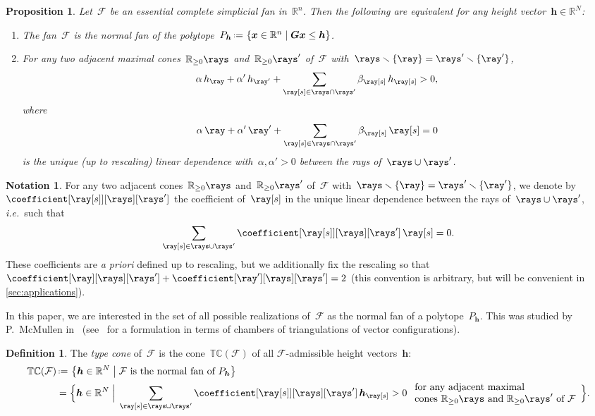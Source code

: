 \documentclass{amsart}
\newtheorem{proposition}[theorem]{Proposition}
\theoremstyle{definition}
\newtheorem{definition}[theorem]{Definition}
\newtheorem{notation}[theorem]{Notation}
\newcommand{\R}{\mathbb{R}} %
\renewcommand{\b}[1]{{\boldsymbol{#1}}} %
\newcommand{\set}[2]{\left\{ #1 \;\middle|\; #2 \right\}} %
\newcommand{\Bigset}[2]{\Big\{ #1 \;\Big|\; #2 \Big\}} %
\newcommand{\ssm}{\smallsetminus} %
\newcommand{\eqdef}{\mbox{\,\raisebox{0.2ex}{\scriptsize\ensuremath{\mathrm:}}\ensuremath{=}\,}} %
\newcommand{\ie}{\textit{i.e.}~} %
\newcommand{\apriori}{\textit{a priori}} %
\newcommand{\darkblue}{\color{darkblue}} %
\newcommand{\defn}[1]{\textsl{\darkblue #1}} %
\newcommand{\Fan}{\mathcal{F}} %
\newcommand{\typeCone}{\mathbb{TC}} %
\begin{document}
\begin{proposition}
\label{prop:characterizationPolytopalFan}
Let~$\Fan$ be an essential complete simplicial fan in~$\R^n$. Then the following are equivalent for any height vector~$\b{h} \in \R^N$:
\begin{enumerate}
\item The fan~$\Fan$ is the normal fan of the polytope~$P_\b{h} \eqdef \set{\b{x} \in \R^n}{\b{G}\b{x} \le \b{h}}$.
\item For any two adjacent maximal cones~$\R_{\ge0}\rays$ and~$\R_{\ge0}\rays'$ of~$\Fan$ with~$\rays \ssm \{\ray\} = \rays' \ssm \{\ray'\}$,
\[
\alpha \, h_{\ray} + \alpha' \, h_{\ray'} + \sum_{\ray[s] \in \rays \cap \rays'} \beta_{\ray[s]} \, h_{\ray[s]} > 0,
\]
where
\[
\alpha \, \ray + \alpha' \, \ray' + \sum_{\ray[s] \in \rays \cap \rays'} \beta_{\ray[s]} \, \ray[s] = 0
\]
is the unique (up to rescaling) linear dependence with~$\alpha, \alpha' > 0$ between the rays of~$\rays \cup \rays'$.
\end{enumerate}
\end{proposition}

\begin{notation}
For any two adjacent cones~$\R_{\ge0}\rays$ and~$\R_{\ge0}\rays'$ of~$\Fan$ with~$\rays \ssm \{\ray\} = \rays' \ssm \{\ray'\}$, we denote by~$\coefficient[{\ray[s]}][\rays][\rays']$ the coefficient of~$\ray[s]$ in the unique linear dependence between the rays of~$\rays \cup \rays'$, \ie such that
\[
\sum_{\ray[s] \in \rays \cup \rays'} \coefficient[{\ray[s]}][\rays][\rays'] \, \ray[s] = 0.
\]
These coefficients are \apriori{} defined up to rescaling, but we additionally fix the rescaling so that~${\coefficient[\ray][\rays][\rays'] + \coefficient[\ray'][\rays][\rays'] = 2}$ (this convention is arbitrary, but will be convenient in \cref{sec:applications}).
\end{notation}

In this paper, we are interested in the set of all possible realizations of~$\Fan$ as the normal fan of a polytope~$P_\b{h}$. This was studied by P.~McMullen in~\cite{McMullen-typeCone} (see~\cite[Sect.~9.5]{DeLoeraRambauSantos} for a formulation in terms of chambers of triangulations of vector configurations).

\begin{definition}
\label{def:typeCone}
The \defn{type cone} of~$\Fan$ is the cone~$\typeCone(\Fan)$ of all $\Fan$-admissible height vectors~$\b{h}$:
\begin{align*}
\typeCone(\Fan) & \eqdef \set{\b{h} \in \R^N}{\Fan \text{ is the normal fan of } P_\b{h}} \\
& = \Bigset{\b{h} \in \R^N}{\sum_{\ray[s] \in \rays \cup \rays'} \coefficient[{\ray[s]}][\rays][\rays'] \, \b{h}_{\ray[s]} > 0 \; \begin{array}{l} \text{for any adjacent maximal} \\ \text{cones~$\R_{\ge0}\rays$ and~$\R_{\ge0}\rays'$ of~$\Fan$} \end{array}}.
\end{align*}
\end{definition}
\end{document}
